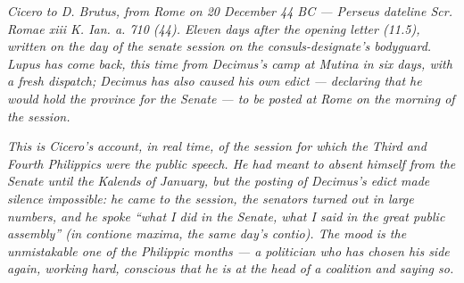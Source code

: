 
\textit{Cicero to D. Brutus, from Rome on 20 December 44 BC
--- Perseus dateline \textit{Scr. Romae xiii K. Ian. a.
710 (44)}. Eleven days after the opening letter (11.5),
written on the day of the senate session on the
consuls-designate's bodyguard. Lupus has come back, this
time from Decimus's camp at Mutina in six days, with a
fresh dispatch; Decimus has also caused his own edict ---
declaring that he would hold the province for the
Senate --- to be posted at Rome on the morning of the
session.}

\textit{This is Cicero's account, in real time, of the
session for which the Third and Fourth Philippics were
the public speech. He had meant to absent himself from
the Senate until the Kalends of January, but the posting
of Decimus's edict made silence impossible: he came to the
session, the senators turned out in large numbers, and he
spoke ``what I did in the Senate, what I said in the great
public assembly'' (\textit{in contione maxima}, the same
day's contio). The mood is the unmistakable one of the
Philippic months --- a politician who has chosen his side
again, working hard, conscious that he is at the head of a
coalition and saying so.}
